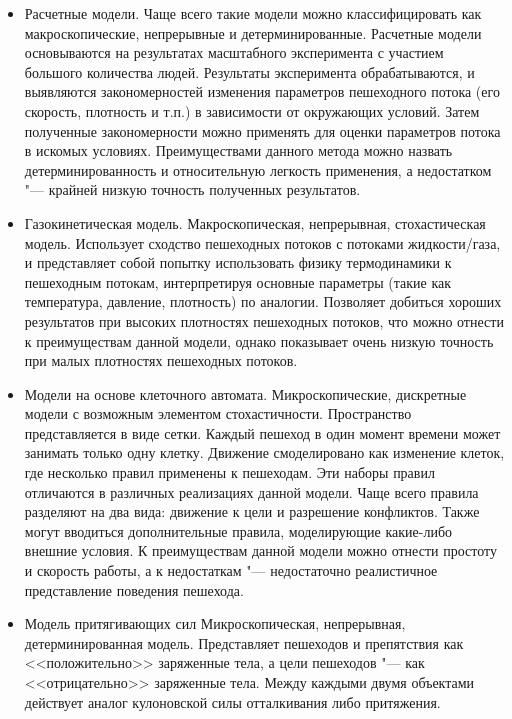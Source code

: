 \begin{itemize}
  \item Расчетные модели.
        Чаще всего такие модели можно классифицировать как макроскопические, непрерывные и детерминированные.
        Расчетные модели основываются на результатах масштабного эксперимента с участием большого количества людей.
        Результаты эксперимента обрабатываются, и выявляются закономерностей изменения параметров пешеходного потока (его скорость, плотность и т.п.) в зависимости от окружающих условий.
        Затем полученные закономерности можно применять для оценки параметров потока в искомых условиях.
        Преимуществами данного метода можно назвать детерминированность и относительную легкость применения, а недостатком "--- крайней низкую точность полученных результатов.
  \item Газокинетическая модель.
        Макроскопическая, непрерывная, стохастическая модель.
        Использует сходство пешеходных потоков с потоками жидкости/газа, и представляет собой попытку использовать физику термодинамики к пешеходным потокам,
        интерпретируя основные параметры (такие как температура, давление, плотность) по аналогии.
        Позволяет добиться хороших результатов при высоких плотностях пешеходных потоков, что можно отнести к преимуществам данной модели,
        однако показывает очень низкую точность при малых плотностях пешеходных потоков.
  \item Модели на основе клеточного автомата.
        Микроскопические, дискретные модели с возможным элементом стохастичности.
        Пространство представляется в виде сетки.  Каждый пешеход в один момент времени может занимать только одну клетку.
        Движение смоделировано как изменение клеток, где несколько правил применены к пешеходам. Эти наборы правил отличаются в различных реализациях данной модели.
        Чаще всего правила разделяют на два вида: движение к цели и разрешение конфликтов.
        Также могут вводиться дополнительные правила, моделирующие какие-либо внешние условия.
        К преимуществам данной модели можно отнести простоту и скорость работы, а к недостаткам "--- недостаточно реалистичное представление поведения пешехода.
  \item Модель притягивающих сил
        Микроскопическая, непрерывная, детерминированная модель.
        Представляет пешеходов и препятствия как <<положительно>> заряженные тела, а цели пешеходов "--- как <<отрицательно>> заряженные тела.
        Между каждыми двумя объектами действует аналог кулоновской силы отталкивания либо притяжения.

\end{itemize}
